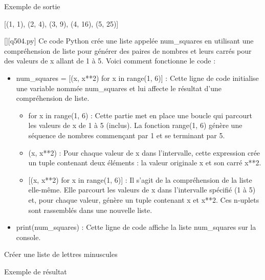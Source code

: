 Exemple de sortie

[(1, 1), (2, 4), (3, 9), (4, 16), (5, 25)]
        \par
        \begin{solution}
            \renewcommand{\nomfichier}{q504.py}
            \pythonfile{\chemincode \nomfichier}[][\nomfichier]
            Ce code Python crée une liste appelée num\_squares en utilisant une compréhension de liste pour générer des paires de nombres et leurs carrés pour des valeurs de x allant de 1 à 5. Voici comment fonctionne le code :\par

\begin{itemize}
\item     num\_squares = [(x, x**2) for x in range(1, 6)] : Cette ligne de code initialise une variable nommée num\_squares et lui affecte le résultat d'une compréhension de liste.

\begin{itemize}
\item         for x in range(1, 6) : Cette partie met en place une boucle qui parcourt les valeurs de x de 1 à 5 (inclus). La fonction range(1, 6) génère une séquence de nombres commençant par 1 et se terminant par 5.
\item         (x, x**2) : Pour chaque valeur de x dans l'intervalle, cette expression crée un tuple contenant deux éléments : la valeur originale x et son carré x**2.
\item{}         [(x, x**2) for x in range(1, 6)] : Il s'agit de la compréhension de la liste elle-même. Elle parcourt les valeurs de x dans l'intervalle spécifié (1 à 5) et, pour chaque valeur, génère un tuple contenant x et x**2. Ces n-uplets sont rassemblés dans une nouvelle liste.
\end{itemize}
\item    print(num\_squares) : Cette ligne de code affiche la liste num\_squares sur la console.
\end{itemize}
        \end{solution}
        

        \question
        Créer une liste de lettres minuscules

Exemple de résultat

